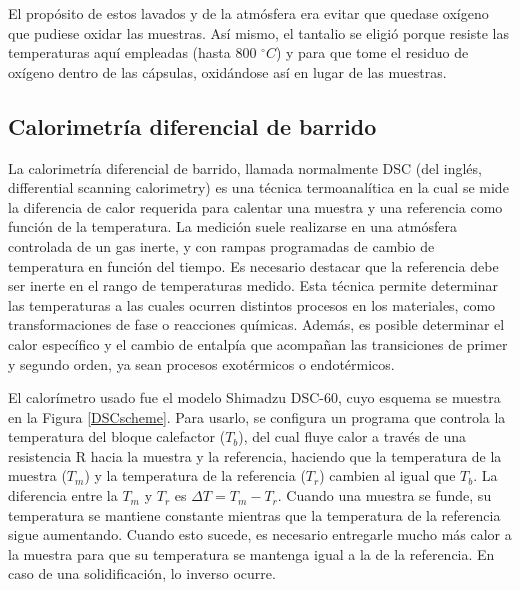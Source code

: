 \documentclass[12pt]{article}
\theoremstyle{definition}
\theoremstyle{remark}
\begin{document}
{El propósito de estos lavados y de la atmósfera era evitar que quedase oxígeno que pudiese oxidar las muestras. Así mismo, el tantalio se eligió porque resiste las temperaturas aquí empleadas (hasta 800 $^\circ C$) y para que tome el residuo de oxígeno dentro de las cápsulas, oxidándose así en lugar de las muestras.

\subsection{Calorimetría diferencial de barrido}

La calorimetría diferencial de barrido, llamada normalmente DSC (del inglés, differential scanning calorimetry) es una técnica termoanalítica en la cual se mide la diferencia de calor requerida para calentar una muestra y una referencia como función de la temperatura. La medición suele realizarse en una atmósfera controlada de un gas inerte, y con rampas programadas de cambio de temperatura en función del tiempo.  Es necesario destacar que la referencia debe ser inerte en el rango de temperaturas medido.
Esta técnica permite determinar las temperaturas a las cuales ocurren distintos procesos en los materiales, como transformaciones de fase o reacciones químicas. Además, es posible determinar el calor específico y el cambio de entalpía que acompañan las transiciones de primer y segundo orden, ya sean procesos exotérmicos o endotérmicos.

El calorímetro usado fue el modelo Shimadzu DSC-60, cuyo esquema se muestra en la Figura \ref{DSCscheme}. Para usarlo, se configura un programa que controla la temperatura del bloque calefactor ($T_b$), del cual fluye calor a través de una resistencia R hacia la muestra y la referencia, haciendo que la temperatura de la muestra ($T_m$) y la temperatura de la referencia ($T_r$) cambien al igual que $T_b$. La diferencia entre la $T_m$ y $T_r$ es $\Delta T = T_m - T_r$. Cuando una muestra se funde, su temperatura se mantiene constante mientras que la temperatura de la referencia sigue aumentando. Cuando esto sucede, es necesario entregarle mucho más calor a la muestra para que su temperatura se mantenga igual a la de la referencia. En caso de una solidificación, lo inverso ocurre.

}
\end{document}
